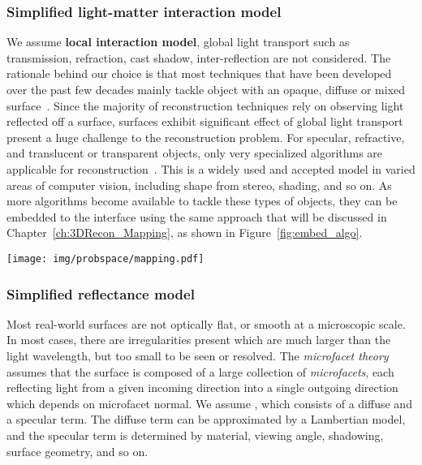 \subsubsection{Simplified light-matter interaction model}
We assume \textbf{local interaction model}, \ie global light transport such as transmission, refraction, cast shadow, inter-reflection are not considered. The rationale behind our choice is that most techniques that have been developed over the past few decades mainly tackle object with an opaque, diffuse or mixed surface~\cite{ihrke2010transparent}. Since the majority of reconstruction techniques rely on observing light reflected off a surface, surfaces exhibit significant effect of global light transport present a huge challenge to the reconstruction problem. For specular, refractive, and translucent or transparent objects, only very specialized algorithms are applicable for reconstruction~\cite{ihrke2010transparent}. This is a widely used and accepted model in varied areas of computer vision, including shape from stereo, shading, and so on. As more algorithms become available to tackle these types of objects, they can be embedded to the interface using the same approach that will be discussed in Chapter~\ref{ch:3DRecon_Mapping}, as shown in Figure~\ref{fig:embed_algo}.
\begin{figure*}[!htbp]
\centering
\texttt{[image: img/probspace/mapping.pdf]}
\caption{Embed algorithms into the interface. The process is three-fold: 1) reduce problem space by discovering \textit{effective properties} denoted by red; 2) discover mapping from the lower-dimensional problem space to algorithm, denoted by green; 3) mapping from problem space to algorithms denoted by blue.}
\label{fig:embed_algo}
\end{figure*}

\subsubsection{Simplified reflectance model}
Most real-world surfaces are not optically flat, or smooth at a microscopic scale. In most cases, there are irregularities present which are much larger than the light wavelength, but too small to be seen or resolved. The \textit{microfacet theory} assumes that the surface is composed of a large collection of \textit{microfacets}, each reflecting light from a given incoming direction into a single outgoing direction which depends on microfacet normal. We assume , which consists of a diffuse and a specular term. The diffuse term can be approximated by a Lambertian model, and the specular term is determined by material, viewing angle, shadowing, surface geometry, and so on.


